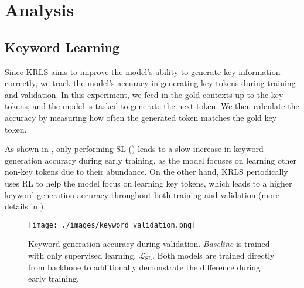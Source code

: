 \section{Analysis}
\label{sec:Analysis}
\subsection{Keyword Learning}
\label{subsec:Keyword Learning}
Since KRLS aims to improve the model's ability to generate key information correctly, we track the model's accuracy in generating key tokens during training and validation. 
In this experiment, we feed in the gold contexts up to the key tokens, and the model is tasked to generate the next token. 
We then calculate the accuracy by measuring how often the generated token matches the gold key token.

As shown in , only performing SL () leads to a slow increase in keyword generation accuracy during early training, as the model focuses on learning other non-key tokens due to their abundance. On the other hand, KRLS periodically uses RL to help the model focus on learning key tokens, which leads to a higher keyword generation accuracy throughout both training and validation (more details in ).
\begin{figure}[t!]
  \centering
  \texttt{[image: ./images/keyword\_validation.png]}%
  \caption{Keyword generation accuracy during validation. \emph{Baseline} is trained with only supervised learning, $\mathcal{L}_{\mathrm{SL}}$. Both models are trained directly from backbone to additionally demonstrate the difference during early training.}
  \label{fig:keyword_learning}
  \vspace{2pt}
\end{figure}
\begin{table}[t]
  \centering
  \caption{Test performance of KRLS when generating with Gold Dialog State (+DST), and with both Gold Dialog State and Gold System Act (+Both). \emph{Train} is the performance of the training dataset. Note that +DST is the same as the ``policy optimization'' task.}
  \label{tbl:using_gold}
\end{table}
